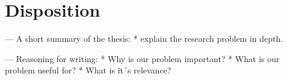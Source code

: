 \section{Disposition}
 --- A short summary of the thesis:
    * explain the research problem in depth.
    
 --- Reasoning for writing:
    * Why is our problem important?
    * What is our problem useful for?
    * What is it´s relevance?

 
